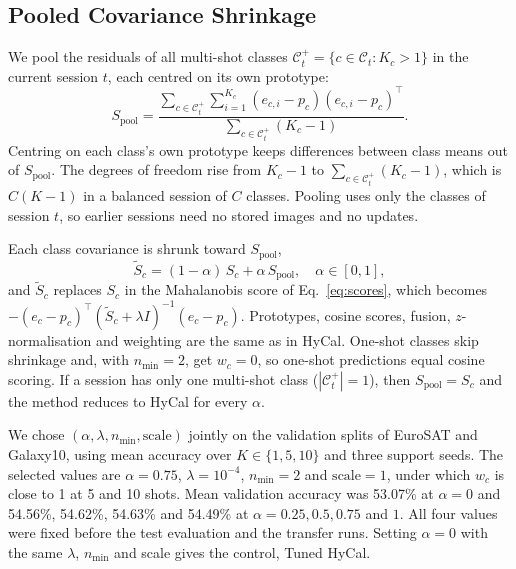 \documentclass[letterpaper]{article} %
\newcommand{\nmin}{n_{\min}}
\begin{document}
\subsection{Pooled Covariance Shrinkage}

We pool the residuals of all multi-shot classes $\mathcal{C}_t^{+} = \{c \in \mathcal{C}_t : K_c > 1\}$ in the current session $t$, each centred on its own prototype:
\begin{equation}
S_{\mathrm{pool}} = \frac{\sum_{c \in \mathcal{C}_t^{+}} \sum_{i=1}^{K_c} (e_{c,i} - p_c)(e_{c,i} - p_c)^\top}{\sum_{c \in \mathcal{C}_t^{+}} (K_c - 1)}.
\label{eq:spool}
\end{equation}
Centring on each class's own prototype keeps differences between class means out of $S_{\mathrm{pool}}$. The degrees of freedom rise from $K_c - 1$ to $\sum_{c \in \mathcal{C}_t^{+}} (K_c - 1)$, which is $C(K-1)$ in a balanced session of $C$ classes. Pooling uses only the classes of session $t$, so earlier sessions need no stored images and no updates.

Each class covariance is shrunk toward $S_{\mathrm{pool}}$,
\begin{equation}
\tilde{S}_c = (1 - \alpha)\, S_c + \alpha\, S_{\mathrm{pool}}, \quad \alpha \in [0, 1],
\label{eq:shrink}
\end{equation}
and $\tilde{S}_c$ replaces $S_c$ in the Mahalanobis score of Eq.~\eqref{eq:scores}, which becomes $-(e_c - p_c)^\top (\tilde{S}_c + \lambda I)^{-1} (e_c - p_c)$. Prototypes, cosine scores, fusion, $z$-normalisation and weighting are the same as in HyCal. One-shot classes skip shrinkage and, with $\nmin = 2$, get $w_c = 0$, so one-shot predictions equal cosine scoring. If a session has only one multi-shot class ($|\mathcal{C}_t^{+}| = 1$), then $S_{\mathrm{pool}} = S_c$ and the method reduces to HyCal for every $\alpha$.

We chose $(\alpha, \lambda, \nmin, \mathrm{scale})$ jointly on the validation splits of EuroSAT and Galaxy10, using mean accuracy over $K \in \{1, 5, 10\}$ and three support seeds. The selected values are $\alpha = 0.75$, $\lambda = 10^{-4}$, $\nmin = 2$ and $\mathrm{scale} = 1$, under which $w_c$ is close to 1 at 5 and 10 shots. Mean validation accuracy was 53.07\% at $\alpha = 0$ and 54.56\%, 54.62\%, 54.63\% and 54.49\% at $\alpha = 0.25, 0.5, 0.75$ and $1$. All four values were fixed before the test evaluation and the transfer runs. Setting $\alpha = 0$ with the same $\lambda$, $\nmin$ and scale gives the control, Tuned HyCal.
\end{document}
